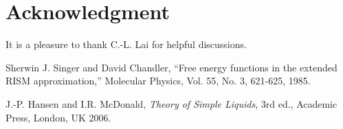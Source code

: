 \documentclass[12pt]{article}
\begin{document}
\section*{Acknowledgment}
It is a pleasure to thank C.-L. Lai for helpful discussions.


\begin{thebibliography}{100}

  Sherwin J. Singer and David Chandler,
  ``Free energy functions in the extended RISM approximation,''
  Molecular Physics, Vol. 55, No. 3, 621-625,
  1985.

  J.-P. Hansen and I.R. McDonald,
  {\it Theory of Simple Liquids}, 3rd ed.,
  Academic Press, London, UK 2006.

\end{thebibliography}
\end{document}
